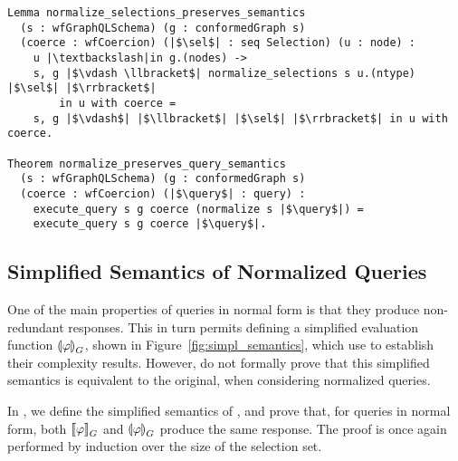 \begin{verbatim}
Lemma normalize_selections_preserves_semantics
  (s : wfGraphQLSchema) (g : conformedGraph s) 
  (coerce : wfCoercion) (|$\sel$| : seq Selection) (u : node) :
    u |\textbackslash|in g.(nodes) ->
    s, g |$\vdash \llbracket$| normalize_selections s u.(ntype) |$\sel$| |$\rrbracket$|
        in u with coerce =
    s, g |$\vdash$| |$\llbracket$| |$\sel$| |$\rrbracket$| in u with coerce. 
    
Theorem normalize_preserves_query_semantics 
  (s : wfGraphQLSchema) (g : conformedGraph s)
  (coerce : wfCoercion) (|$\query$| : query) :
    execute_query s g coerce (normalize s |$\query$|) =
    execute_query s g coerce |$\query$|.
\end{verbatim}


\subsection{Simplified Semantics of Normalized Queries}
\label{sec:simpl-semantics}

One of the main properties of queries in normal form is that they produce non-redundant responses.
This in turn permits defining a simplified evaluation function $\llparenthesis \varphi \rrparenthesis^{}_{G}$, shown in Figure~\ref{fig:simpl_semantics}, which \HP use to establish their complexity results.
However, \HP do not formally prove that this simplified semantics is equivalent to the original, when considering normalized queries.

In \gcoql, we define the simplified semantics of \HP, and prove that, for queries in normal form, both $\llbracket \varphi \rrbracket^{}_{G}$ and $\llparenthesis \varphi \rrparenthesis^{}_{G}$ produce the same response. 
%
The proof is once again performed by induction over the size of the selection set.

